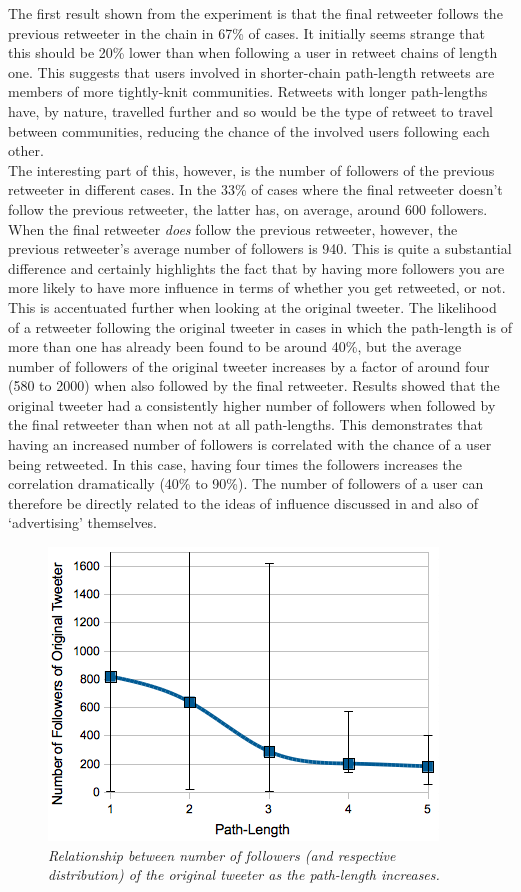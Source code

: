 The first result shown from the experiment is that the final retweeter follows the previous retweeter in the chain in 67\% of cases. It initially seems strange that this should be 20\% lower than when following a user in retweet chains of length one. This suggests that users involved in shorter-chain path-length retweets are members of more tightly-knit communities. Retweets with longer path-lengths have, by nature, travelled further and so would be the type of retweet to travel between communities, reducing the chance of the involved users following each other.\\
The interesting part of this, however, is the number of followers of the previous retweeter in different cases. In the 33\% of cases where the final retweeter doesn't follow the previous retweeter, the latter has, on average, around 600 followers. When the final retweeter \textit{does} follow the previous retweeter, however, the previous retweeter's average number of followers is 940. This is quite a substantial difference and certainly highlights the fact that by having more followers you are more likely to have more influence in terms of whether you get retweeted, or not.\\
This is accentuated further when looking at the original tweeter. The likelihood of a retweeter following the original tweeter in cases in which the path-length is of more than one has already been found to be around 40\%, but the average number of followers of the original tweeter increases by a factor of around four (580 to 2000) when also followed by the final retweeter. Results showed that the original tweeter had a consistently higher number of followers when followed by the final retweeter than when not at all path-lengths. This demonstrates that having an increased number of followers is correlated with the chance of a user being retweeted. In this case, having four times the followers increases the correlation dramatically (40\% to 90\%). The number of followers of a user can therefore be directly related to the ideas of influence discussed in \cite{cha10} and also of `advertising' themselves.\\
\begin{figure}[h]
\includegraphics[scale=0.6]{3.Chapter1/Media/originalfollowers-pathlength-distribution.png} 
\caption{\textit{Relationship between number of followers (and respective distribution) of the original tweeter as the path-length increases.}}
\label{fig:originalfollowers-pathlength}
\end{figure}
